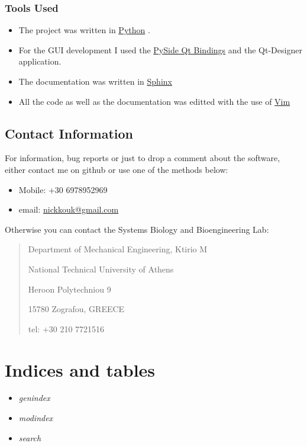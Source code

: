 \documentclass[letterpaper,10pt,english]{sphinxmanual}
\begin{document}
\subsection{Tools Used}
\label{about:tools-used}\begin{itemize}
\item {} 
The project was written in \href{http://www.python.org}{Python} .

\item {} 
For the GUI development I used the \href{http://qt-project.org/wiki/pyside}{PySide Qt Bindings} and the Qt-Designer application.

\item {} 
The documentation was written in \href{http://sphinx-doc.org/}{Sphinx}

\item {} 
All the code as well as the documentation was editted with the use of \href{http://www.vim.org/}{Vim}

\end{itemize}


\section{Contact Information}
\label{contact-info::doc}\label{contact-info:contact-information}
For information, bug reports or just to drop a comment about the software, either contact me on github
or use one of the methods below:
\begin{itemize}
\item {} 
Mobile: +30 6978952969

\item {} 
email: \href{mailto:nickkouk@gmail.com}{nickkouk@gmail.com}

\end{itemize}

Otherwise you can contact the Systems Biology and Bioengineering Lab:
\begin{quote}

\begin{DUlineblock}{0em}
\item[] Department of Mechanical Engineering, Ktirio M
\item[] National Technical University of Athens
\item[] Heroon Polytechniou 9
\item[] 15780 Zografou, GREECE
\item[] tel: +30 210 7721516
\end{DUlineblock}
\end{quote}


\chapter{Indices and tables}
\label{index:indices-and-tables}\begin{itemize}
\item {} 
\emph{genindex}

\item {} 
\emph{modindex}

\item {} 
\emph{search}

\end{itemize}



\renewcommand{\indexname}{Index}
\printindex
\end{document}
